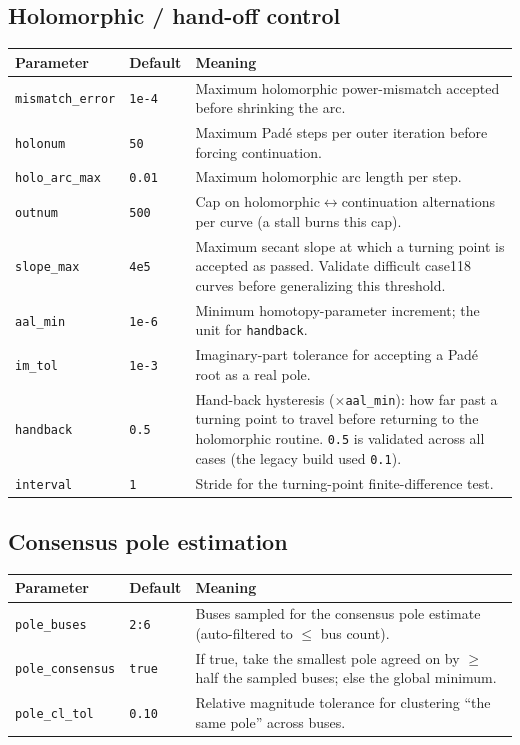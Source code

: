 \documentclass[11pt,a4paper]{article}
\newcommand{\code}[1]{\texttt{#1}}
\begin{document}
\subsection{Holomorphic / hand-off control}
\begin{center}\small
\begin{longtable}{@{}p{}p{}p{}@{}}
\toprule
\textbf{Parameter} & \textbf{Default} & \textbf{Meaning}\\
\midrule\endhead
\code{mismatch_error}& \code{1e-4} & Maximum holomorphic power-mismatch accepted before shrinking the arc.\\
\code{holonum}      & \code{50}   & Maximum Pad\'e steps per outer iteration before forcing continuation.\\
\code{holo_arc_max} & \code{0.01} & Maximum holomorphic arc length per step.\\
\code{outnum}       & \code{500}  & Cap on holomorphic$\leftrightarrow$continuation alternations per curve (a stall burns this cap).\\
\code{slope_max}    & \code{4e5}  & Maximum secant slope at which a turning point is accepted as passed. Validate difficult case118 curves before generalizing this threshold.\\
\code{aal_min}      & \code{1e-6} & Minimum homotopy-parameter increment; the unit for \code{handback}.\\
\code{im_tol}       & \code{1e-3} & Imaginary-part tolerance for accepting a Pad\'e root as a real pole.\\
\code{handback}     & \code{0.5}  & Hand-back hysteresis ($\times$\code{aal_min}): how far past a turning point to travel before returning to the holomorphic routine. \code{0.5} is validated across all cases (the legacy build used \code{0.1}).\\
\code{interval}     & \code{1}    & Stride for the turning-point finite-difference test.\\
\bottomrule
\end{longtable}
\end{center}

\subsection{Consensus pole estimation}
\begin{center}\small
\begin{longtable}{@{}p{}p{}p{}@{}}
\toprule
\textbf{Parameter} & \textbf{Default} & \textbf{Meaning}\\
\midrule\endhead
\code{pole_buses}     & \code{2:6}      & Buses sampled for the consensus pole estimate (auto-filtered to $\le$ bus count).\\
\code{pole_consensus}  & \code{true}     & If true, take the smallest pole agreed on by $\ge$ half the sampled buses; else the global minimum.\\
\code{pole_cl_tol}     & \code{0.10}     & Relative magnitude tolerance for clustering ``the same pole'' across buses.\\
\bottomrule
\end{longtable}
\end{center}
\end{document}
